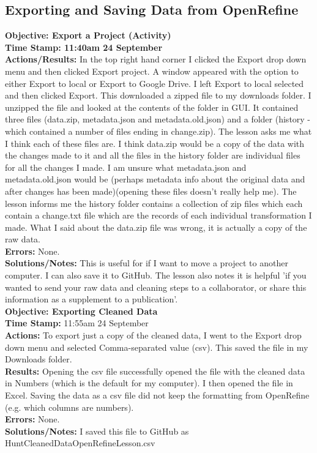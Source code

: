 \documentclass{article}
\begin{document}
\begin{FlushLeft}
\subsection{Exporting and Saving Data from OpenRefine}
\textbf{Objective: Export a Project (Activity)}\\ 
\textbf{Time Stamp: 11:40am 24 September} \\
\textbf{Actions/Results:} In the top right hand corner I clicked the Export drop down menu and then clicked Export project. A window appeared with the option to either Export to local or Export to Google Drive. I left Export to local selected and then clicked Export. This downloaded a zipped file to my downloads folder. I unzipped the file and looked at the contents of the folder in GUI. It contained three files (data.zip, metadata.json and metadata.old.json) and a folder (history - which contained a number of files ending in change.zip). The lesson asks me what I think each of these files are. I think data.zip would be a copy of the data with the changes made to it and all the files in the history folder are individual files for all the changes I made. I am unsure what metadata.json and metadata.old.json would be (perhaps metadata info about the original data and after changes has been made)(opening these files doesn't really help me). The lesson informs me the history folder contains a collection of zip files which each contain a change.txt file which are the records of each individual transformation I made. What I said about the data.zip file was wrong, it is actually a copy of the raw data.\\
\textbf{Errors:} None.\\
\textbf{Solutions/Notes:} This is useful for if I want to move a project to another computer. I can also save it to GitHub. The lesson also notes it is helpful 'if you wanted to send your raw data and cleaning steps to a collaborator, or share this information as a supplement to a publication'.\\
\vspace{5mm}
\textbf{Objective: Exporting Cleaned Data}\\ 
\textbf{Time Stamp:} 11:55am 24 September \\
\textbf{Actions:} To export just a copy of the cleaned data, I went to the Export drop down menu and selected Comma-separated value (csv). This saved the file in my Downloads folder.\\
\textbf{Results:} Opening the csv file successfully opened the file with the cleaned data in Numbers (which is the default for my computer). I then opened the file in Excel. Saving the data as a csv file did not keep the formatting from OpenRefine (e.g. which columns are numbers).\\
\textbf{Errors:} None.\\
\textbf{Solutions/Notes:} I saved this file to GitHub as Hunt\textunderscore Cleaned\textunderscore Data\textunderscore OpenRefine\textunderscore Lesson.csv\\
\vspace{5mm}


\end{FlushLeft}
\end{document}
